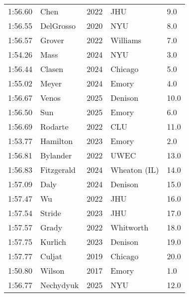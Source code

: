 \begin{table}[H]
\begin{minipage}[t]{0.48\textwidth}
\begin{tabular}{@{}p{1.8cm}p{2.8cm}p{1.2cm}p{1.4cm}p{0.8cm}@{}}
\hline
    1:56.60 & Chen & 2022 & JHU & 9.0 \\
    1:56.55 & DelGrosso & 2020 & NYU & 8.0 \\
    1:56.57 & Grover & 2022 & Williams & 7.0 \\
    1:54.26 & Mass & 2024 & NYU & 3.0 \\
    1:56.44 & Clasen & 2024 & Chicago & 5.0 \\
    1:55.02 & Meyer & 2024 & Emory & 4.0 \\
    1:56.67 & Venos & 2025 & Denison & 10.0 \\
    1:56.50 & Sun & 2025 & Emory & 6.0 \\
    1:56.69 & Rodarte & 2022 & CLU & 11.0 \\
    1:53.77 & Hamilton & 2023 & Emory & 2.0 \\
    1:56.81 & Bylander & 2022 & UWEC & 13.0 \\
    1:56.83 & Fitzgerald & 2024 & Wheaton (IL) & 14.0 \\
    1:57.09 & Daly & 2024 & Denison & 15.0 \\
    1:57.47 & Wu & 2022 & JHU & 16.0 \\
    1:57.54 & Stride & 2023 & JHU & 17.0 \\
    1:57.57 & Grady & 2022 & Whitworth & 18.0 \\
    1:57.75 & Kurlich & 2023 & Denison & 19.0 \\
    1:57.77 & Culjat & 2019 & Chicago & 20.0 \\
    1:50.80 & Wilson & 2017 & Emory & 1.0 \\
    1:56.77 & Nechydyuk & 2025 & NYU & 12.0 \\
\hline
\end{tabular}
\end{minipage}
\end{table}

